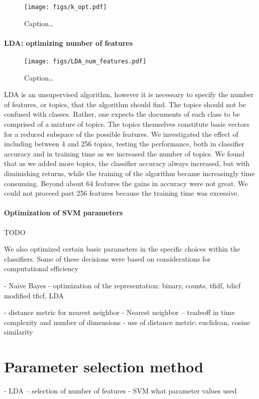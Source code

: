 \documentclass[conference,letterpaper]{IEEEtran}
\begin{document}
\begin{figure}
	\centering
	\texttt{[image: figs/k\_opt.pdf]}
	\caption{Caption\dots}
	\label{fig:k_opt}
\end{figure}


\paragraph{LDA: optimizing number of features}

\begin{figure}
	\centering
	\texttt{[image: figs/LDA\_num\_features.pdf]}
	\caption{Caption\dots}
	\label{fig:LDA_num_features}
\end{figure}

LDA is an unsupervised algorithm, however it is necessary to specify the 
number of features, or topics, that the algorithm should find.  The topics
should not be confused with classes.  Rather, one expects the documents of 
each class to be comprised of a mixture of topics.  The topics themselves 
constitute basis vectors for a reduced subspace of the possible features.
We investigated the effect of including between 4 and 256 topics, testing the
performance, both in classifier accuracy and in training time as we increased
the number of topics.  We found that as we added more topics, the classifier
accuracy always increased, but with diminishing returns, while the training
of the algorithm became increasingly time consuming.  Beyond about 64 features
the gains in accuracy were not great.  We could not proceed past 256 features
because the training time was excessive.

\paragraph{Optimization of SVM parameters}
TODO




We also optimized certain basic parameters in the specific choices within the classifiers.  Some of these 
decisions were based on considerations for computational efficiency

- Naive Bayes 
	- optimization of the representation: binary, counts, tfidf, tdicf
		modified tficf, LDA

- distance metric for nearest neighbor
- Nearest neighbor -- tradeoff in time complexity and number of dimensions
	- use of distance metric: euclidean, cosine similarity

\section{Parameter selection method}
- LDA -- selection of number of features
- SVM what parameter values used
\end{document}
